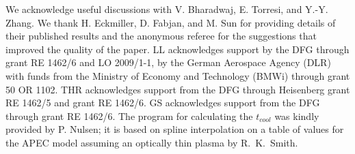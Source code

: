 \documentclass{aa} %
\begin{document}
 
\begin{acknowledgements}
  We acknowledge useful discussions with V. Bharadwaj, E. Torresi, and Y.-Y. Zhang. We thank H. Eckmiller, D. Fabjan, and M. Sun for providing details of their published results and the anonymous referee for the suggestions that improved the quality of the paper. LL acknowledges support by the DFG through grant RE 1462/6 and
  LO 2009/1-1, by the German Aerospace Agency (DLR) with funds from the
  Ministry of Economy and Technology (BMWi) through grant 50 OR
  1102. THR acknowledges support from the DFG through Heisenberg grant
  RE 1462/5 and grant RE 1462/6. GS acknowledges support from the DFG through grant
  RE 1462/6. The program for calculating the
  $t_{cool}$ was kindly provided by P. Nulsen; it is based on
  spline interpolation on a table of values for the APEC model
  assuming an optically thin plasma by R.~K.~Smith.
\end{acknowledgements}


 




\end{document}
